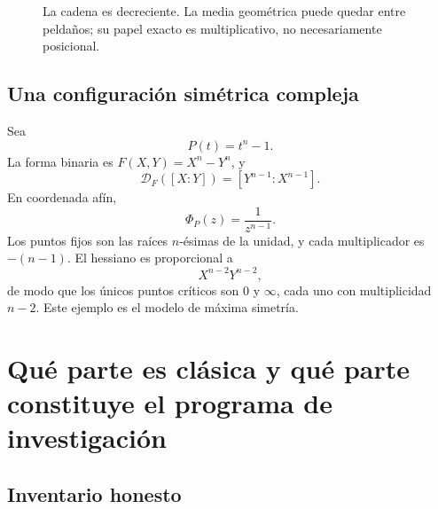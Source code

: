 \documentclass[11pt,oneside]{scrartcl}
\theoremstyle{plainblue}
\theoremstyle{definitionblue}
\theoremstyle{remarkgray}
\newcommand{\GM}{\operatorname{GM}}
\newcommand{\cN}{\mathfrak{N}}
\newcommand{\cD}{\mathcal{D}}
\begin{document}
\begin{figure}[ht]
\centering
{}
\caption{La cadena es decreciente. La media geométrica puede quedar entre peldaños; su papel exacto es multiplicativo, no necesariamente posicional.}
\label{fig:four-root-chain}
\end{figure}

\subsection{Una configuración simétrica compleja}

Sea
\[
P(t)=t^n-1.
\]
La forma binaria es \(F(X,Y)=X^n-Y^n\), y
\[
\cD_F([X:Y])=[Y^{n-1}:X^{n-1}].
\]
En coordenada afín,
\begin{equation}\label{eq:power-reciprocal}
\Phi_P(z)=\frac{1}{z^{n-1}}.
\end{equation}
Los puntos fijos son las raíces \(n\)-ésimas de la unidad, y cada multiplicador es
\(-(n-1)\). El hessiano es proporcional a
\[
X^{n-2}Y^{n-2},
\]
de modo que los únicos puntos críticos son \(0\) y \(\infty\), cada uno con
multiplicidad \(n-2\). Este ejemplo es el modelo de máxima simetría.

\section{Qué parte es clásica y qué parte constituye el programa de investigación}

\subsection{Inventario honesto}
\end{document}
